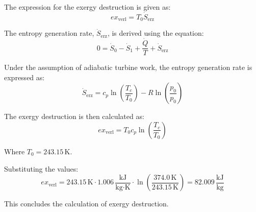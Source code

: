 The expression for the exergy destruction is given as:  
\[
ex_{\text{verl}} = T_0 \dot{S}_{\text{erz}}
\]  

The entropy generation rate, \( \dot{S}_{\text{erz}} \), is derived using the equation:  
\[
0 = \dot{S}_{0} - \dot{S}_{1} + \frac{\dot{Q}}{T} + \dot{S}_{\text{erz}}
\]  

Under the assumption of adiabatic turbine work, the entropy generation rate is expressed as:  
\[
\dot{S}_{\text{erz}} = c_p \ln \left( \frac{T_c}{T_0} \right) - R \ln \left( \frac{p_0}{p_0} \right)
\]  

The exergy destruction is then calculated as:  
\[
ex_{\text{verl}} = T_0 c_p \ln \left( \frac{T_c}{T_0} \right)
\]  

Where \( T_0 = 243.15 \, \text{K} \).  

Substituting the values:  
\[
ex_{\text{verl}} = 243.15 \, \text{K} \cdot 1.006 \, \frac{\text{kJ}}{\text{kg·K}} \cdot \ln \left( \frac{374.0 \, \text{K}}{243.15 \, \text{K}} \right) = 82.009 \, \frac{\text{kJ}}{\text{kg}}
\]  

This concludes the calculation of exergy destruction.